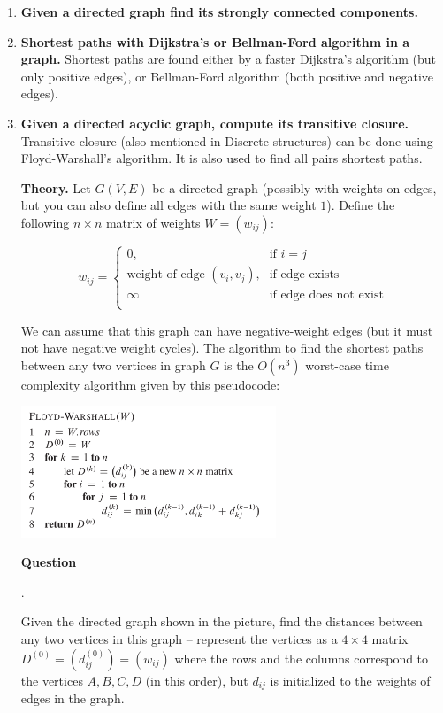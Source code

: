 \documentclass[a4paper,12pt]{article}
\newcounter{mcounter}
\newcommand\showmcounter{\addtocounter{mcounter}{1}\themcounter}
\begin{document}
{\begin{enumerate}[label=2.\Alph*.]
{\bf Node.} DFS for topological sorting always works, 
since a node in DFS traversal is never exited before a node it points to is exited.


\item {\bf Given a directed graph find its strongly connected components.}

\item {\bf Shortest paths with Dijkstra's or Bellman-Ford algorithm in a graph.} 
Shortest paths are found either by a faster Dijkstra's algorithm (but only positive edges), 
or Bellman-Ford algorithm (both positive and negative edges).

\item {\bf Given a directed acyclic graph, compute its transitive closure.}
Transitive closure (also mentioned in Discrete structures) 
can be done using Floyd-Warshall's algorithm. 
It is also used to find all pairs shortest paths. 

{\bf Theory.} Let $G(V,E)$ be a directed graph (possibly with weights on edges, 
but you can also define all edges with the same weight $1$). 
Define the following $n \times n$ matrix of weights $W = (w_{ij})$: 

\[ w_{ij} = \left\{ \begin{array}{ll}
0, & \mbox{if $i = j$}\\
\mbox{weight of edge $(v_i,v_j)$,} & \mbox{if edge exists}\\
\infty & \mbox{if edge does not exist}\\
\end{array} \right. \]

We can assume that this graph can have negative-weight edges (but it 
must not have negative weight cycles). 
The algorithm to find the shortest paths between 
any two vertices in graph $G$ is the $O(n^3)$ worst-case 
time complexity algorithm given by this pseudocode: 

\begin{center}
\includegraphics[width=3in]{ds-exam3/floyd-warshall.png}
\end{center}


\vspace{10pt}
{\bf Question \showmcounter.}
Given the directed graph shown in the picture, find the distances 
between any two vertices in this graph -- represent the vertices 
as a $4 \times 4$ matrix $D^{(0)} = (d^{(0)}_{ij}) = (w_{ij})$ where 
the rows and the columns correspond to the vertices $A,B,C,D$ (in this order),
but $d_{ij}$ is initialized to the weights of edges in the graph.



\end{enumerate}}
\end{document}
